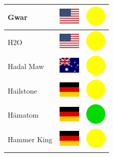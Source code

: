 \documentclass[12pt, a4paper, twoside]{report}
\begin{document}
\begin{center}
\begin{longtable}{|p{5cm}|p{2cm}|p{2cm}|}
Gwar & \includegraphics[width=1cm]{4x3/us} & \includegraphics[width=1cm]{likes/m} \\ \hline
H2O & \includegraphics[width=1cm]{4x3/us} & \includegraphics[width=1cm]{likes/m} \\ \hline
Hadal Maw & \includegraphics[width=1cm]{4x3/au} & \includegraphics[width=1cm]{likes/m} \\ \hline
Hailstone & \includegraphics[width=1cm]{4x3/de} & \includegraphics[width=1cm]{likes/m} \\ \hline
Hämatom & \includegraphics[width=1cm]{4x3/de} & \includegraphics[width=1cm]{likes/y} \\ \hline
Hammer King & \includegraphics[width=1cm]{4x3/de} & \includegraphics[width=1cm]{likes/m} \\ \hline

\end{longtable}
\end{center}
\end{document}
